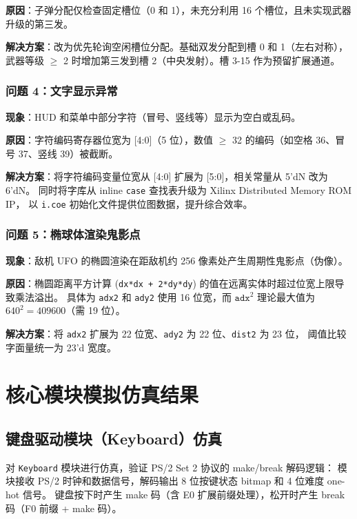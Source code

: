 \documentclass[12pt,a4paper]{ctexart}
\begin{document}
\textbf{原因}：子弹分配仅检查固定槽位（0 和 1），未充分利用 16 个槽位，且未实现武器升级的第三发。

\textbf{解决方案}：改为优先轮询空闲槽位分配。基础双发分配到槽 0 和 1（左右对称），
武器等级 $\ge$ 2 时增加第三发到槽 2（中央发射）。槽 3-15 作为预留扩展通道。

\subsubsection{问题 4：文字显示异常}

\textbf{现象}：HUD 和菜单中部分字符（冒号、竖线等）显示为空白或乱码。

\textbf{原因}：字符编码寄存器位宽为 [4:0]（5 位），数值 $\ge$ 32 的编码（如空格 36、冒号 37、竖线 39）被截断。

\textbf{解决方案}：将字符编码变量位宽从 [4:0] 扩展为 [5:0]，相关常量从 5'dN 改为 6'dN。
同时将字库从 inline \texttt{case} 查找表升级为 Xilinx Distributed Memory ROM IP，
以 \texttt{i.coe} 初始化文件提供位图数据，提升综合效率。

\subsubsection{问题 5：椭球体渲染鬼影点}

\textbf{现象}：敌机 UFO 的椭圆渲染在距敌机约 256 像素处产生周期性鬼影点（伪像）。

\textbf{原因}：椭圆距离平方计算 (\texttt{dx*dx + 2*dy*dy}) 的值在远离实体时超过位宽上限导致乘法溢出。
具体为 \texttt{adx2} 和 \texttt{ady2} 使用 16 位宽，而 $\texttt{adx}^2$ 理论最大值为 $640^2 = 409600$（需 19 位）。

\textbf{解决方案}：将 \texttt{adx2} 扩展为 22 位宽、\texttt{ady2} 为 22 位、\texttt{dist2} 为 23 位，
阈值比较字面量统一为 23'd 宽度。



\section{核心模块模拟仿真结果}

\subsection{键盘驱动模块（Keyboard）仿真}

对 \texttt{Keyboard} 模块进行仿真，验证 PS/2 Set 2 协议的 make/break 解码逻辑：
模块接收 PS/2 时钟和数据信号，解码输出 8 位按键状态 bitmap 和 4 位难度 one-hot 信号。
键盘按下时产生 make 码（含 E0 扩展前缀处理），松开时产生 break 码（F0 前缀 + make 码）。
\end{document}
